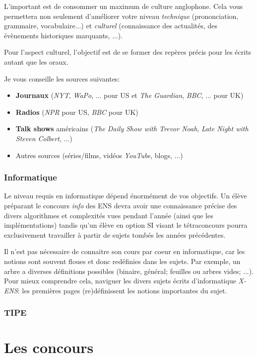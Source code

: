 \documentclass{article}
\begin{document}
L'important est de consommer un maximum de culture anglophone.
Cela vous permettera non seulement d'améliorer votre niveau \textit{technique} (prononciation, grammaire, vocabulaire...) et \textit{culturel} (connaissance des actualités, des évènements historiques marquants, ...).

Pour l'aspect culturel, l'objectif est de se former des repères précis pour les écrits autant que les oraux.

Je vous conseille les sources suivantes:


\begin{itemize}
\item  \textbf{Journaux} (\textit{NYT}, \textit{WaPo}, ... pour US et \textit{The Guardian}, \textit{BBC}, ... pour UK)
\item  \textbf{Radios} (\textit{NPR} pour US, \textit{BBC} pour UK)
\item  \textbf{Talk shows} américains (\textit{The Daily Show with Trevor Noah}, \textit{Late Night with Steven Colbert}, ...)
\item  Autres sources (séries/films, vidéos \textit{YouTube}, blogs, ...)

\end{itemize}

\section{Informatique}

Le niveau requis en informatique dépend énormément de vos objectifs.
Un élève préparant le concours \textit{info} des ENS devra avoir une connaissance précise des divers algorithmes et complexités vues pendant l'année (ainsi que les implémentations) tandis qu'un élève en option SI visant le tétraconcours pourra exclusivement travailler à partir de sujets tombés les années précédentes.

Il n'est pas nécessaire de connaitre son cours par coeur en informatique, car les notions sont souvent floues et donc redéfinies dans les sujets.
Par exemple, un arbre a diverses définitions possibles (binaire, général; feuilles ou arbres vides; ...).
Pour mieux comprendre cela, naviguer les divers sujets écrits d'informatique \textit{X-ENS}: les premières pages (re)définissent les notions importantes du sujet.

\section{TIPE}
\part{Les concours}
\end{document}
